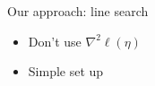 \documentclass[ 10pt]{beamer}
\newcommand{\etaMLE}{\hat{\eta}_{\textrm{MLE}}}
\begin{document}
{\begin{columns}[]
\begin{column}[t]{0.4\textwidth}
{\begin{block}{Our approach: line search}
\begin{itemize}
\item Don't use $\nabla^2 \ell( \eta)$
\vspace{1mm}
\item Simple set up
\vspace{2mm}
\end{itemize}
\end{block}
}
\end{column}
\end{columns}

}

%
%
%
%
\end{document}
